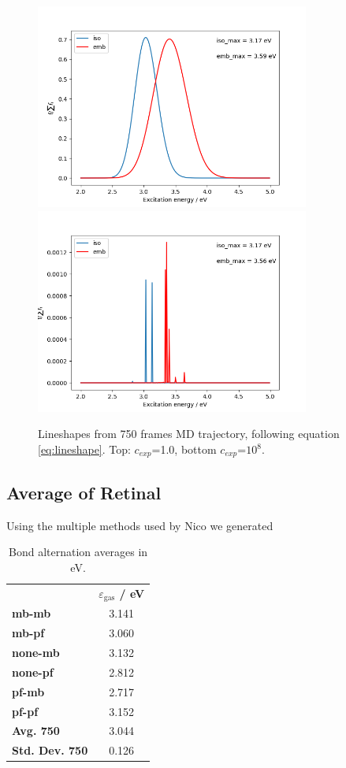 \documentclass[twoside, 12pt]{article}
\begin{document}
\begin{figure}[H]
\centering
\includegraphics[width=9cm]{./figures/both_lineshape_broad.png}\includegraphics[width=9cm]{./figures/both_lineshape_sharp.png}
\caption{Lineshapes from 750 frames MD trajectory, following equation \ref{eq:lineshape}. Top: $c_{exp}$=1.0, bottom $c_{exp}$=$10^{8}$. } 
\label{fig:lineshape}
\end{figure}



\subsection{Average of Retinal}
Using the multiple methods used by Nico we generated 

\begin{table}[h]
\footnotesize
\centering
\caption{Bond alternation averages in eV.}
\label{tab:ex_ret_avrg}
\begin{tabular}{lc}
& \textbf{$\varepsilon_\mathrm{gas}$ / eV} \\ 
\textbf{mb-mb} & 3.141 \\ 
\textbf{mb-pf} & 3.060 \\ 
\textbf{none-mb} & 3.132 \\ 
\textbf{none-pf} & 2.812 \\ 
\textbf{pf-mb} & 2.717 \\ 
\textbf{pf-pf} & 3.152\\ 
\textbf{Avg. 750} &  3.044 \\ 
\textbf{Std. Dev. 750} &  0.126\\ 
\end{tabular}
\end{table}
\end{document}
